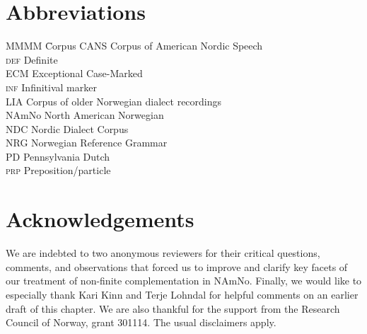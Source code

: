 \documentclass[output=paper,colorlinks,citecolor=brown]{langscibook}
\begin{document}
\section*{Abbreviations}

\begin{tabbing}
MMMM \= Corpus\kill
CANS \> Corpus of American Nordic Speech \\
\textsc{def} \> Definite \\
ECM \> Exceptional Case-Marked \\
\textsc{inf} \> Infinitival marker \\
LIA \> Corpus of older Norwegian dialect recordings \\
NAmNo \> North American Norwegian \\
NDC \> Nordic Dialect Corpus \\
NRG \> Norwegian Reference Grammar \\
PD \> Pennsylvania Dutch\\
\textsc{prp} \> Preposition/particle \\
\end{tabbing}

\section*{Acknowledgements}
We are indebted to two anonymous reviewers for their critical questions, comments, and observations that forced us to improve and clarify key facets of our treatment of non-finite complementation in NAmNo. Finally, we would like to especially thank Kari Kinn and Terje Lohndal for helpful comments on an earlier draft of this chapter. We are also thankful for the support from the Research Council of Norway, grant 301114. The usual disclaimers apply. 


\printbibliography[heading=subbibliography,notkeyword=this]
\end{document}
